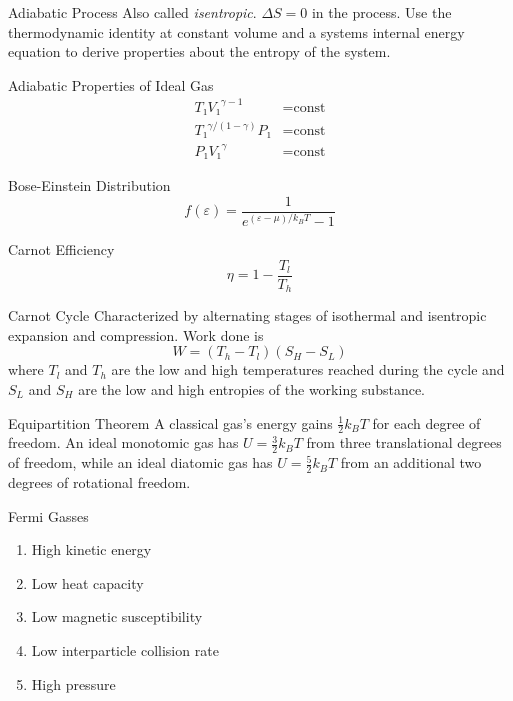\documentclass[avery5371]{flashcards}
\begin{document}

\begin{flashcard}{Adiabatic Process}
	Also called \emph{isentropic}. $ΔS = 0$ in the process. Use the
	thermodynamic identity at constant volume and a systems internal energy
	equation to derive properties about the entropy of the system.
\end{flashcard}

\begin{flashcard}{Adiabatic Properties of Ideal Gas}
	\begin{align*}
		T₁ {V₁}^{γ-1} &= \text{const} \\
		{T₁}^{γ/(1-γ)} P₁ &= \text{const} \\
		P₁ {V₁}^γ &= \text{const}
	\end{align*}
\end{flashcard}

\begin{flashcard}{Bose-Einstein Distribution}
	\[ f(ε) = \frac{1}{e^{(ε-μ)/k_B T} - 1} \]
\end{flashcard}

\begin{flashcard}{Carnot Efficiency}
	\[ η = 1 - \frac{T_l}{T_h} \]
\end{flashcard}

\begin{flashcard}{Carnot Cycle}
	Characterized by alternating stages of isothermal and isentropic expansion
	and compression. Work done is
	\[ W = (T_h - T_l)(S_H - S_L) \]
	where $T_l$ and $T_h$ are the low and high temperatures reached during the
	cycle and $S_L$ and $S_H$ are the low and high entropies of the working
	substance.
\end{flashcard}

\begin{flashcard}{Equipartition Theorem}
	A classical gas's energy gains $\frac 12 k_B T$ for each degree of
	freedom. An ideal monotomic gas has
		$ U = \frac 32 k_B T $
	from three translational degrees of freedom, while an ideal diatomic gas
	has
		$ U = \frac 52 k_B T $
	from an additional two degrees of rotational freedom.
\end{flashcard}

\begin{flashcard}{Fermi Gasses}
	\begin{enumerate}
		\item High kinetic energy
		\item Low heat capacity
		\item Low magnetic susceptibility
		\item Low interparticle collision rate
		\item High pressure
	\end{enumerate}
\end{flashcard}
\end{document}

